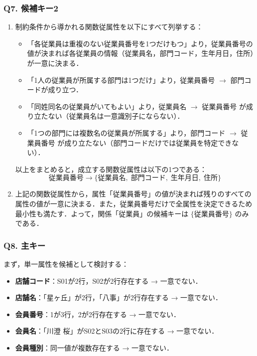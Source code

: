 \subsubsection*{Q7. 候補キー2}
\begin{enumerate}
    \item 制約条件から導かれる関数従属性を以下にすべて列挙する：
        \begin{itemize}
            \item 「各従業員は重複のない従業員番号を1つだけもつ」より，従業員番号の値が決まれば各従業員の情報（従業員名，部門コード，生年月日，住所）が一意に決まる．
            \item 「1人の従業員が所属する部門は1つだけ」より，従業員番号 $\to$ 部門コードが成り立つ．
            \item 「同姓同名の従業員がいてもよい」より，従業員名 $\to$ 従業員番号 が成り立たない（従業員名は一意識別子にならない）．
            \item 「1つの部門には複数名の従業員が所属する」より，部門コード $\to$ 従業員番号 が成り立たない（部門コードだけでは従業員を特定できない）．
        \end{itemize}
        以上をまとめると，成立する関数従属性は以下の1つである：
        \begin{equation}
        \text{従業員番号} \to \{\text{従業員名},\; \text{部門コード},\; \text{生年月日},\; \text{住所}\}
        \end{equation}
    \item 上記の関数従属性から，属性「従業員番号」の値が決まれば残りのすべての属性の値が一意に決まる．また，従業員番号だけで全属性を決定できるため最小性も満たす．よって，関係「従業員」の候補キーは $\{\text{従業員番号}\}$ のみである．
\end{enumerate}

\subsubsection*{Q8. 主キー}
まず，単一属性を候補として検討する：
\begin{itemize}
    \item \textbf{店舗コード}：S01が2行，S02が2行存在する → 一意でない．
    \item \textbf{店舗名}：「星ヶ丘」が2行，「八事」が2行存在する → 一意でない．
    \item \textbf{会員番号}：1が3行，2が2行存在する → 一意でない．
    \item \textbf{会員名}：「川澄 桜」がS02とS03の2行に存在する → 一意でない．
    \item \textbf{会員種別}：同一値が複数存在する → 一意でない．
\end{itemize}

